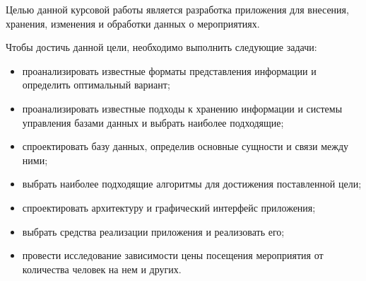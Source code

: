 
Целью данной курсовой работы является разработка приложения для внесения, хранения, изменения и обработки данных о мероприятиях. 

Чтобы достичь данной цели, необходимо выполнить следующие задачи:
\begin{itemize}[label=--]
	\item проанализировать известные форматы представления информации и определить оптимальный вариант;
	\item проанализировать известные подходы к хранению информации и системы управления базами данных и выбрать наиболее подходящие;
	\item спроектировать базу данных, определив основные сущности и связи между ними;
	\item выбрать наиболее подходящие алгоритмы для достижения поставленной цели;
	\item спроектировать архитектуру и графический интерфейс приложения;
	\item выбрать средства реализации приложения и реализовать его;
	\item провести исследование зависимости цены посещения мероприятия от количества человек на нем и других.
\end{itemize}

\clearpage
